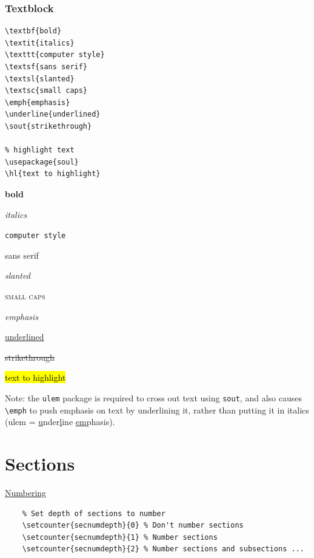 \documentclass{article}
\begin{document}
\subsubsection{Textblock}
\begin{minipage}[t]{0.5\textwidth}
\begin{lstlisting}
\textbf{bold}
\textit{italics}
\texttt{computer style}
\textsf{sans serif}
\textsl{slanted}
\textsc{small caps}
\emph{emphasis}
\underline{underlined}
\sout{strikethrough}

% highlight text
\usepackage{soul}
\hl{text to highlight}

\end{lstlisting}
\end{minipage}%
\begin{minipage}[t]{0.5\textwidth}
    \begin{list}{}
        \item \textbf{bold}
        \item \textit{italics}
        \item \texttt{computer style}
        \item \textsf{sans serif}
        \item \textsl{slanted}
        \item \textsc{small caps}
        \item \emph{emphasis}
        \item \underline{underlined}
        \item \sout{strikethrough}
        \item \hl{text to highlight}
    \end{list}
\end{minipage}

Note: the \verb|ulem| package is required to cross out text using
\verb|sout|, and also causes \verb|\emph| to push emphasis on
text by underlining it, rather than putting it in italics
(ulem = \underline{u}nder\underline{l}ine \underline{em}phasis).



\clearpage
\section{Sections}
\begin{minipage}{\textwidth}
\href{https://www.sharelatex.com/learn/Sections_and_chapters#Numbered_and_unnumbered_sections}
    {Numbering}
\end{minipage}

\begin{lstlisting}
    % Set depth of sections to number
    \setcounter{secnumdepth}{0} % Don't number sections
    \setcounter{secnumdepth}{1} % Number sections
    \setcounter{secnumdepth}{2} % Number sections and subsections ...
\end{lstlisting}
\end{document}
